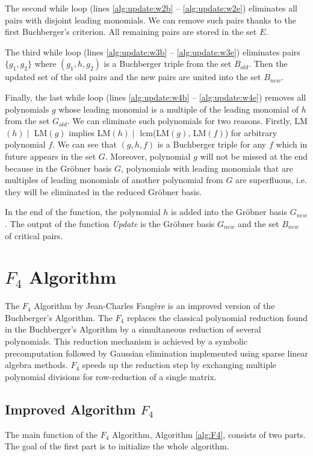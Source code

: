 The second while loop (lines \ref{alg:update:w2b} -- \ref{alg:update:w2e}) eliminates all pairs with disjoint leading monomials. We can remove such pairs thanks to the first Buchberger's criterion. All remaining pairs are stored in the set $E$.

The third while loop (lines \ref{alg:update:w3b} -- \ref{alg:update:w3e}) eliminates pairs $\{g_1, g_2\}$ where $(g_1, h, g_2)$ is a Buchberger triple from the set $B_{old}$. Then the updated set of the old pairs and the new pairs are united into the set $B_{new}$.

Finally, the last while loop (lines \ref{alg:update:w4b} -- \ref{alg:update:w4e}) removes all polynomials $g$ whose leading monomial is a multiple of the leading monomial of $h$ from the set $G_{old}$. We can eliminate such polynomials for two reasons. Firstly, LM$(h) \mid$ LM$(g)$ implies LM$(h) \mid$ lcm(LM$(g)$, LM$(f)$) for arbitrary polynomial $f$. We can see that $(g, h, f)$ is a Buchberger triple for any $f$ which in future appears in the set $G$. Moreover, polynomial $g$ will not be missed at the end because in the Gr\"obner basis $G$, polynomials with leading monomials that are multiples of leading monomials of another polynomial from $G$ are superfluous, i.e. they will be eliminated in the reduced Gr\"obner basis.

In the end of the function, the polynomial $h$ is added into the Gr\"obner basis $G_{new}$. The output of the function \textit{Update} is the Gr\"obner basis $G_{new}$ and the set $B_{new}$ of critical pairs.



\section{$F_4$ Algorithm}
\label{sec:F4}
The $F_4$ Algorithm \cite{F4} by Jean-Charles Faug\`ere is an improved version of the Buchberger's Algorithm. The $F_4$ replaces the classical polynomial reduction found in the Buchberger's Algorithm by a simultaneous reduction of several polynomials. This reduction mechanism is achieved by a symbolic precomputation followed by Gaussian elimination implemented using sparse linear algebra methods. $F_4$ speeds up the reduction step by exchanging multiple polynomial divisions for row-reduction of a single matrix.

\subsection{Improved Algorithm $F_4$}
The main function of the $F_4$ Algorithm, Algorithm \ref{alg:F4}, consists of two parts. The goal of the first part is to initialize the whole algorithm.

